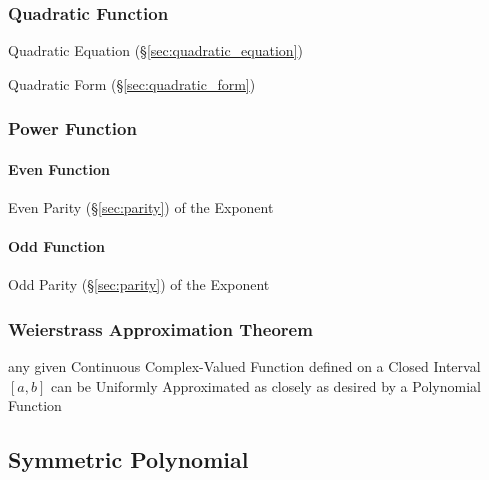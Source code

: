 \subsubsection{Quadratic Function}\label{sec:quadratic_function}

\fist Quadratic Equation (\S\ref{sec:quadratic_equation})

\fist Quadratic Form (\S\ref{sec:quadratic_form})



\subsubsection{Power Function}\label{sec:power_function}


\paragraph{Even Function}\label{sec:even_function}\hfill

Even Parity (\S\ref{sec:parity}) of the Exponent



\paragraph{Odd Function}\label{sec:odd_function}\hfill

Odd Parity (\S\ref{sec:parity}) of the Exponent



\subsubsection{Weierstrass Approximation Theorem}
\label{sec:weierstrass_approximation}

any given Continuous Complex-Valued Function defined on a Closed Interval
$[a,b]$ can be Uniformly Approximated as closely as desired by a Polynomial
Function



\subsection{Symmetric Polynomial}\label{sec:symmetric_polynomial}

